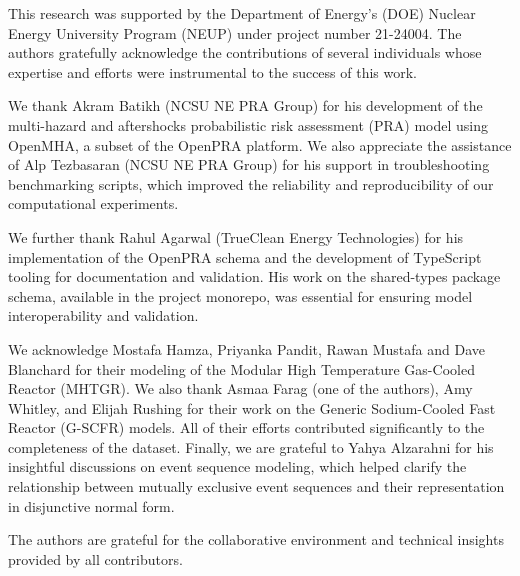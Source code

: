 \begin{acknowledgments}
This research was supported by the Department of Energy's (DOE) Nuclear Energy University Program (NEUP) under project number 21-24004. The authors gratefully acknowledge the contributions of several individuals whose expertise and efforts were instrumental to the success of this work.

We thank Akram Batikh (NCSU NE PRA Group) for his development of the multi-hazard and aftershocks probabilistic risk assessment (PRA) model using OpenMHA, a subset of the OpenPRA platform. We also appreciate the assistance of Alp Tezbasaran (NCSU NE PRA Group) for his support in troubleshooting benchmarking scripts, which improved the reliability and reproducibility of our computational experiments.

We further thank Rahul Agarwal (TrueClean Energy Technologies) for his implementation of the OpenPRA schema and the development of TypeScript tooling for documentation and validation. His work on the shared-types package schema, available in the project monorepo, was essential for ensuring model interoperability and validation.

We acknowledge Mostafa Hamza, Priyanka Pandit, Rawan Mustafa and Dave Blanchard for their modeling of the Modular High Temperature Gas-Cooled Reactor (MHTGR). We also thank Asmaa Farag (one of the authors), Amy Whitley, and Elijah Rushing for their work on the Generic Sodium-Cooled Fast Reactor (G-SCFR) models. All of their efforts contributed significantly to the completeness of the dataset. Finally, we are grateful to Yahya Alzarahni for his insightful discussions on event sequence modeling, which helped clarify the relationship between mutually exclusive event sequences and their representation in disjunctive normal form.

The authors are grateful for the collaborative environment and technical insights provided by all contributors.
\end{acknowledgments}